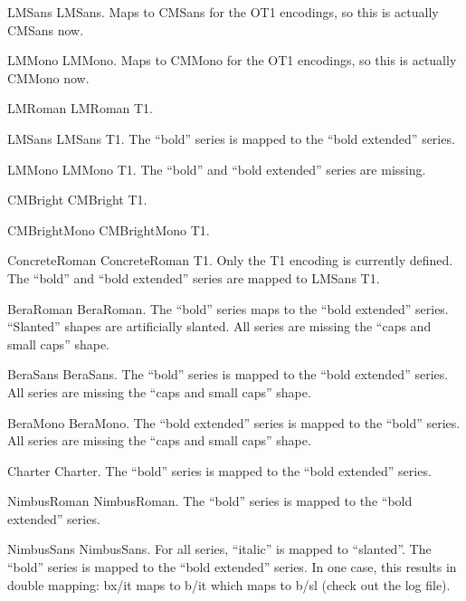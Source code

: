 \nextfamily LMSans
LMSans.  Maps to CMSans for the OT1 encodings, so this is actually
CMSans now.
\nextsize 1pc

\nextfamily LMMono
LMMono.  Maps to CMMono for the OT1 encodings, so this is actually
CMMono now.
\nextsize 1pc



\nextfamily LMRoman
LMRoman T1.
\nextsize 1pc

\nextfamily LMSans
LMSans T1.  The ``bold'' series is mapped to the ``bold extended''
series.
\nextsize 1pc

\nextfamily LMMono
LMMono T1.  The ``bold'' and ``bold extended'' series are missing.
\nextsize 1pc

\nextfamily CMBright
CMBright T1.
\nextsize 1pc

\nextfamily CMBrightMono
CMBrightMono T1.
\nextsize 1pc

\nextfamily ConcreteRoman
ConcreteRoman T1.  Only the T1 encoding is currently defined.  The
``bold'' and ``bold extended'' series are mapped to LMSans T1.
\nextsize 1pc

\nextfamily BeraRoman
BeraRoman.  The ``bold'' series maps to the ``bold extended'' series.
``Slanted'' shapes are artificially slanted.  All series are missing
the ``caps and small caps'' shape.
\nextsize 1pc

\nextfamily BeraSans
BeraSans.  The ``bold'' series is mapped to the ``bold extended''
series.  All series are missing the ``caps and small caps'' shape.
\nextsize 1pc

\nextfamily BeraMono
BeraMono.  The ``bold extended'' series is mapped to the ``bold''
series.  All series are missing the ``caps and small caps'' shape.
\nextsize 1pc

\nextfamily Charter
Charter.  The ``bold'' series is mapped to the ``bold extended''
series.
\nextsize 1pc

\nextfamily NimbusRoman
NimbusRoman.  The ``bold'' series is mapped to the ``bold extended''
series.
\nextsize 1pc

\nextfamily NimbusSans
NimbusSans.  For all series, ``italic'' is mapped to ``slanted''.  The
``bold'' series is mapped to the ``bold extended'' series.  In one
case, this results in double mapping:  bx/it maps to b/it which maps
to b/sl (check out the log file).
\nextsize 1pc

